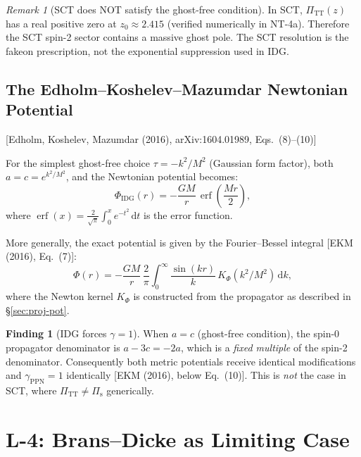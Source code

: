 \documentclass[11pt,a4paper]{article}
\theoremstyle{plain}
\theoremstyle{definition}
\newtheorem{finding}[theorem]{Finding}
\theoremstyle{remark}
\newtheorem{remark}[theorem]{Remark}
\newcommand{\dd}{\mathrm{d}}
\DeclareMathOperator{\erf}{erf}
\newcommand{\fromlit}[1]{\textcolor{sctblue}{\textsf{[#1]}}}
\begin{document}
\begin{remark}[SCT does NOT satisfy the ghost-free condition]
\label{rem:sct-ghost}
In SCT, $\Pi_{\mathrm{TT}}(z)$ has a real positive zero at
$z_0 \approx 2.415$ (verified numerically in NT-4a).
Therefore the SCT spin-2 sector contains a massive ghost pole.
The SCT resolution is the fakeon prescription, not the
exponential suppression used in IDG.
\end{remark}

\subsection{The Edholm--Koshelev--Mazumdar Newtonian Potential}

\fromlit{Edholm, Koshelev, Mazumdar (2016), arXiv:1604.01989,
Eqs.~(8)--(10)}

For the simplest ghost-free choice $\tau = -k^2/M^2$
(Gaussian form factor), both $a = c = e^{k^2/M^2}$, and
the Newtonian potential becomes:
\begin{equation}\label{eq:Phi-idg}
  \Phi_{\mathrm{IDG}}(r) = -\frac{GM}{r}\,\erf\!\left(\frac{Mr}{2}\right),
\end{equation}
where $\erf(x) = \frac{2}{\sqrt{\pi}}\int_0^x e^{-t^2}\,\dd t$ is
the error function.

More generally, the exact potential is given by the Fourier--Bessel
integral \fromlit{EKM (2016), Eq.~(7)}:
\begin{equation}\label{eq:idg-FB}
  \Phi(r) = -\frac{GM}{r}\,\frac{2}{\pi}\int_0^\infty
  \frac{\sin(kr)}{k}\,K_\Phi(k^2/M^2)\,\dd k,
\end{equation}
where the Newton kernel $K_\Phi$ is constructed from the propagator
as described in \S\ref{sec:proj-pot}.

\begin{finding}[IDG forces $\gamma = 1$]\label{find:idg-gamma}
When $a = c$ (ghost-free condition), the spin-0 propagator denominator
is $a - 3c = -2a$, which is a \emph{fixed multiple} of the spin-2
denominator.  Consequently both metric potentials receive identical
modifications and $\gamma_{\mathrm{PPN}} = 1$ identically
\fromlit{EKM (2016), below Eq.~(10)}.
This is \emph{not} the case in SCT, where $\Pi_{\mathrm{TT}}
\neq \Pi_{\mathrm{s}}$ generically.
\end{finding}


\section{L-4: Brans--Dicke as Limiting Case}\label{sec:BD}
\end{document}

